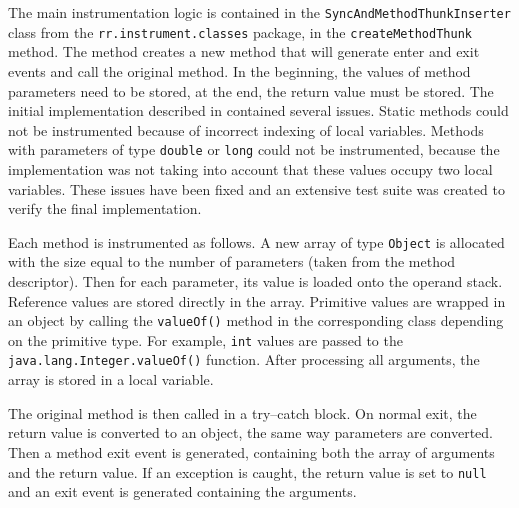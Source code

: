 The main instrumentation logic is contained in the
\texttt{SyncAndMethodThunkInserter} class from the
\texttt{rr.instrument.classes} package, in the \texttt{createMethodThunk}
method. The method creates a new method that will generate enter and exit events
and call the original method. In the beginning, the values of method parameters
need to be stored, at the end, the return value must be stored. The initial
implementation described in \cite{janousek} contained several issues. Static
methods could not be instrumented because of incorrect indexing of local
variables. Methods with parameters of type \texttt{double} or \texttt{long}
could not be instrumented, because the implementation was not taking into
account that these values occupy two local variables. These issues have been
fixed and an extensive test suite was created to verify the final
implementation.

Each method is instrumented as follows. A new array of type \texttt{Object} is
allocated with the size equal to the number of parameters (taken from the method
descriptor). Then for each parameter, its value is loaded onto the operand
stack. Reference values are stored directly in the array. Primitive values are
wrapped in an object by calling the \texttt{valueOf()} method in the
corresponding class depending on the primitive type. For example, \texttt{int}
values are passed to the \texttt{java.lang.Integer.valueOf()} function. After
processing all arguments, the array is stored in a local variable.

The original method is then called in a try--catch block. On normal exit, the
return value is converted to an object, the same way parameters are converted.
Then a method exit event is generated, containing both the array of arguments
and the return value. If an exception is caught, the return value is set to
\texttt{null} and an exit event is generated containing the arguments.

